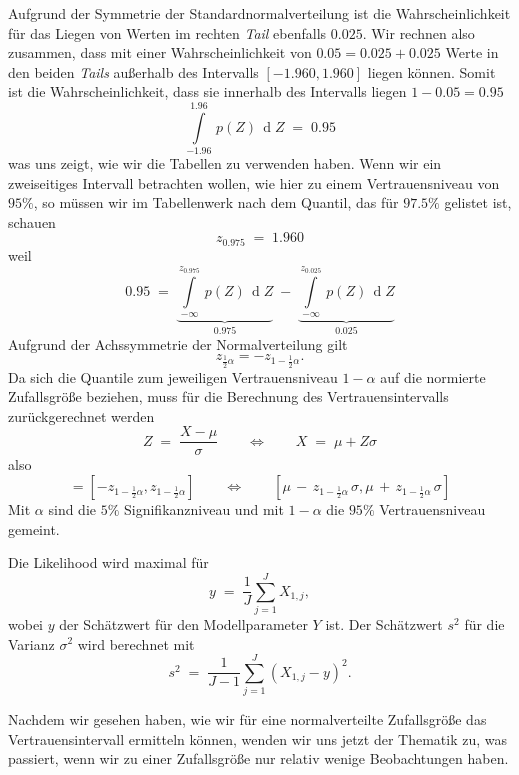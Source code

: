 Aufgrund der Symmetrie der Standardnormalverteilung ist die Wahrscheinlichkeit für das Liegen von
Werten im rechten \textsl{Tail} ebenfalls $0.025$. Wir rechnen also zusammen, dass mit
einer Wahrscheinlichkeit von $0.05 = 0.025+0.025$ Werte in den beiden \textsl{Tails} außerhalb
des Intervalls $[-1.960, 1.960]$ liegen können. Somit ist die Wahrscheinlichkeit, dass sie
innerhalb des Intervalls liegen $1 - 0.05 = 0.95$
\begin{equation}
\int\limits_{-1.96}^{1.96} \, p(Z) \, \operatorname{d} Z \; = \; 0.95
\end{equation}
was uns zeigt, wie wir die Tabellen zu verwenden haben.
Wenn wir ein zweiseitiges Intervall betrachten wollen, wie hier zu einem Vertrauensniveau
von $95 \%$, so müssen wir im Tabellenwerk nach dem Quantil, das für $97.5 \%$ gelistet
ist, schauen
$$
z_{0.975} \; = \; 1.960
$$
weil
$$
0.95 \; = \;
\underbrace{\int\limits_{-\infty}^{z_{0.975}} \, p(Z) \, \operatorname{d} Z}_{0.975} \; - \;
\underbrace{\int\limits_{-\infty}^{z_{0.025}} \, p(Z) \, \operatorname{d} Z}_{0.025}
$$
Aufgrund der Achssymmetrie der Normalverteilung gilt
$$
z_{\frac{1}{2}\alpha} = -z_{1-\frac{1}{2}\alpha} .
$$
Da sich die Quantile zum jeweiligen Vertrauensniveau $1-\alpha$ auf die normierte Zufallsgröße
beziehen, muss für die Berechnung des Vertrauensintervalls zurückgerechnet werden
\begin{equation}
Z \; = \; \frac{X - \mu}{\sigma} \qquad \Leftrightarrow \qquad X \; = \; \mu + Z \sigma
\end{equation}
also
\begin{equation}
[z_{\frac{1}{2}\alpha}, z_{1-\frac{1}{2}\alpha}] =
[-z_{1-\frac{1}{2}\alpha}, z_{1-\frac{1}{2}\alpha}]
 \qquad \Leftrightarrow  \qquad
[\mu \, - \, z_{1-\frac{1}{2}\alpha} \, \sigma, \mu \, + \, z_{1-\frac{1}{2}\alpha} \, \sigma]
\end{equation}
Mit $\alpha$ sind die $5 \%$ Signifikanzniveau und mit $1-\alpha$ die $95 \%$ Vertrauensniveau gemeint.

Die Likelihood wird maximal für
\begin{equation}
y \; = \; \frac{1}{J} \sum_{j=1}^J X_{1,j} ,
\end{equation}
wobei $y$ der Schätzwert für den Modellparameter $Y$ ist.
Der Schätzwert $s^2$ für die Varianz $\sigma^2$ wird berechnet mit
\begin{equation}
s^2 \; = \; \frac{1}{J-1} \sum_{j=1}^J (X_{1,j} - y)^2 .
\end{equation}

Nachdem wir gesehen haben, wie wir für eine normalverteilte Zufallsgröße
das Vertrauensintervall ermitteln können, wenden wir uns jetzt der Thematik zu,
was passiert, wenn wir zu einer Zufallsgröße nur relativ wenige Beobachtungen haben.

